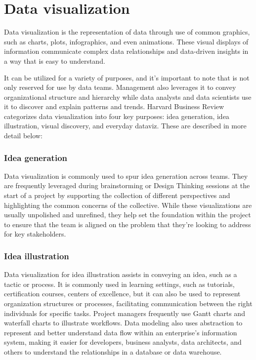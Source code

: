 \documentclass[MSE,Master,english]{twbook}%
\begin{document}
\section{Data visualization}
Data visualization\cite{dataviz} is the representation of data through use of common graphics, such as charts, plots, infographics, and even animations. These visual displays of information communicate complex data relationships and data-driven insights in a way that is easy to understand.

It can be utilized for a variety of purposes, and it's important to note that is not only reserved for use by data teams. Management also leverages it to convey organizational structure and hierarchy while data analysts and data scientists use it to discover and explain patterns and trends. Harvard Business Review\cite{hbr} categorizes data visualization into four key purposes: idea generation, idea illustration, visual discovery, and everyday dataviz. These are described in more detail below:

\subsubsection{Idea generation}
Data visualization is commonly used to spur idea generation across teams. They are frequently leveraged during brainstorming or Design Thinking sessions at the start of a project by supporting the collection of different perspectives and highlighting the common concerns of the collective. While these visualizations are usually unpolished and unrefined, they help set the foundation within the project to ensure that the team is aligned on the problem that they're looking to address for key stakeholders.

\subsubsection{Idea illustration}
Data visualization for idea illustration assists in conveying an idea, such as a tactic or process. It is commonly used in learning settings, such as tutorials, certification courses, centers of excellence, but it can also be used to represent organization structures or processes, facilitating communication between the right individuals for specific tasks. Project managers frequently use Gantt charts and waterfall charts to illustrate workflows. Data modeling also uses abstraction to represent and better understand data flow within an enterprise's information system, making it easier for developers, business analysts, data architects, and others to understand the relationships in a database or data warehouse.
\end{document}
